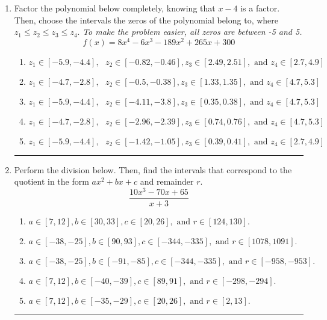 \documentclass[14pt]{extbook}
\newcommand{\litem}[1]{\item#1\hspace*{-1cm}\rule{\textwidth}{0.4pt}}
\begin{document}
\begin{enumerate}
{\begin{enumerate}[label=\Alph*.]
\end{enumerate} }
\litem{
Factor the polynomial below completely, knowing that $x -4$ is a factor. Then, choose the intervals the zeros of the polynomial belong to, where $z_1 \leq z_2 \leq z_3 \leq z_4$. \textit{To make the problem easier, all zeros are between -5 and 5.}\[ f(x) = 8x^{4} -6 x^{3} -189 x^{2} +265 x + 300 \]\begin{enumerate}[label=\Alph*.]
\item \( z_1 \in [-5.9, -4.4], \text{   }  z_2 \in [-0.82, -0.46], z_3 \in [2.49, 2.51], \text{   and   } z_4 \in [2.7, 4.9] \)
\item \( z_1 \in [-4.7, -2.8], \text{   }  z_2 \in [-0.5, -0.38], z_3 \in [1.33, 1.35], \text{   and   } z_4 \in [4.7, 5.3] \)
\item \( z_1 \in [-5.9, -4.4], \text{   }  z_2 \in [-4.11, -3.8], z_3 \in [0.35, 0.38], \text{   and   } z_4 \in [4.7, 5.3] \)
\item \( z_1 \in [-4.7, -2.8], \text{   }  z_2 \in [-2.96, -2.39], z_3 \in [0.74, 0.76], \text{   and   } z_4 \in [4.7, 5.3] \)
\item \( z_1 \in [-5.9, -4.4], \text{   }  z_2 \in [-1.42, -1.05], z_3 \in [0.39, 0.41], \text{   and   } z_4 \in [2.7, 4.9] \)

\end{enumerate} }
\litem{
Perform the division below. Then, find the intervals that correspond to the quotient in the form $ax^2+bx+c$ and remainder $r$.\[ \frac{10x^{3} -70 x + 65}{x + 3} \]\begin{enumerate}[label=\Alph*.]
\item \( a \in [7, 12], b \in [30, 33], c \in [20, 26], \text{ and } r \in [124, 130]. \)
\item \( a \in [-38, -25], b \in [90, 93], c \in [-344, -335], \text{ and } r \in [1078, 1091]. \)
\item \( a \in [-38, -25], b \in [-91, -85], c \in [-344, -335], \text{ and } r \in [-958, -953]. \)
\item \( a \in [7, 12], b \in [-40, -39], c \in [89, 91], \text{ and } r \in [-298, -294]. \)
\item \( a \in [7, 12], b \in [-35, -29], c \in [20, 26], \text{ and } r \in [2, 13]. \)


\end{enumerate}}
\end{enumerate}
\end{document}
